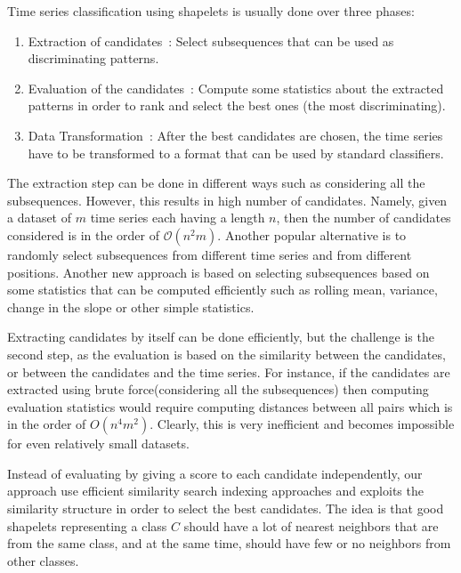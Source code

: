 \documentclass[sigconf, nonacm]{acmart}
\begin{document}
Time series classification using shapelets is usually done over three phases:
\begin{enumerate}
	\item Extraction of candidates~\cite{keogh_shapelet, random_shapelets, fss}:
	      Select subsequences that can be used as discriminating patterns.
	\item Evaluation of the candidates~\cite{alternative_measures,
		      shapelet_transform, silhoutte_shapelets}: Compute some statistics
	      about the extracted patterns in order to rank and select the best
	      ones (the most discriminating).
	\item Data Transformation~\cite{shapelet_transform}: After the best
	      candidates are chosen, the time series have to be transformed to a
	      format that can be used by standard classifiers.
\end{enumerate}
The extraction step can be done in different ways such as considering all the
subsequences. However, this results in high number of candidates. Namely, given
a dataset of $m$ time series each having a length $n$, then the number of
candidates considered is in the order of $\mathcal{O}(n^2m)$. Another popular
alternative is to randomly select subsequences from different time series and
from different positions. Another new approach is based on selecting
subsequences based on some statistics that can be computed efficiently such as
rolling mean, variance, change in the slope or other simple statistics.

Extracting candidates by itself can be done efficiently, but the challenge is
the second step, as the evaluation is based on the similarity between the
candidates, or between the candidates and the time series. For instance, if the
candidates are extracted using brute force(considering all the subsequences)
then computing evaluation statistics would require computing distances between
all pairs which is in the order of $O(n^4m^2)$. Clearly, this is very
inefficient and becomes impossible for even relatively small datasets.

Instead of evaluating by giving a score to each candidate independently, our
approach use efficient similarity search indexing approaches and exploits the
similarity structure in order to select the best candidates. The idea is that
good shapelets representing a class $C$ should have a lot of nearest neighbors
that are from the same class, and at the same time, should have few or no
neighbors from other classes.
\end{document}
